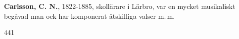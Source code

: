 \textbf{Carlsson, C. N.}, 1822-1885, skollärare i Lärbro, var en mycket musikaliskt begåvad man ock har komponerat
åtskilliga valser m.\,m.

441 
